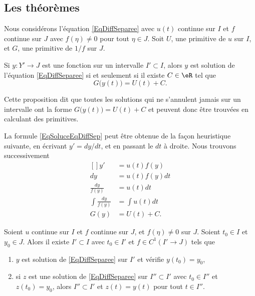 \subsection{Les théorèmes}

\begin{proposition}     \label{ProJLykrK}
Nous considérons l'équation \eqref{EqDiffSeparee} avec $u(t)$ continue sur $I$ et $f$ continue sur $J$ avec $f(\eta)\neq 0$ pour tout $\eta\in J$. Soit $U$, une primitive de $u$ sur $I$, et $G$, une primitive de $1/f$ sur $J$.

Si $y\colon Y'\to J$ est une fonction sur un intervalle $I'\subset I$, alors $y$ est solution de l'équation \eqref{EqDiffSeparee} si et seulement si il existe $C\in\eR$ tel que
\begin{equation}		\label{EqSoluceEqDiffSep}
	G\big( y(t) \big)=U(t)+C.
\end{equation}
\end{proposition}
Cette proposition dit que toutes les solutions qui ne s'annulent jamais sur un intervalle ont la forme $G\big( y(t) \big)=U(t)+C$ et peuvent donc être trouvées en calculant des primitives.

La formule \eqref{EqSoluceEqDiffSep} peut être obtenue de la façon heuristique suivante, en écrivant $y'=dy/dt$, et en passant le $dt$ à droite. Nous trouvons successivement
\begin{equation}
	\begin{aligned}[]
		y'&=u(t)f(y)\\
		dy&=u(t)f(y)dt\\
		\frac{ dy }{ f(y) }&=u(t)dt\\
		\int\frac{ dy }{ f(y) }&=\int u(t)dt\\
		G(y)&=U(t)+C.
	\end{aligned}
\end{equation}

\begin{proposition} \label{PropOkmXmC}
Soient $u$ continue sur $I$ et $f$ continue sur $J$, et $f(\eta)\neq 0$ sur $J$. Soient $t_0\in I$ et $y_0\in J$. Alors il existe $I'\subset I$ avec $t_0\in I'$ et $f\in C^1(I'\to J)$ tels que
\begin{enumerate}

\item
$y$ est solution de \eqref{EqDiffSeparee} sur $I'$ et vérifie $y(t_0)=y_0$,
\item
si $z$ est une solution de \eqref{EqDiffSeparee} sur $I''\subset I'$ avec $t_0\in I''$ et $z(t_0)=y_0$, alors $I''\subset I'$ et $z(t)=y(t)$ pour tout $t\in I''$.

\end{enumerate}
\end{proposition}

